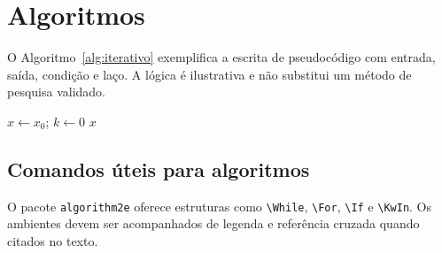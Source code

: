 \section{Algoritmos}
O Algoritmo~\ref{alg:iterativo} exemplifica a escrita de pseudocódigo com entrada, saída, condição e laço. A lógica é ilustrativa e não substitui um método de pesquisa validado.
\begin{algorithm}[htbp]
\caption{Iteração com critério de parada}\label{alg:iterativo}
$x\leftarrow x_0$; $k\leftarrow 0$\;
\Return $x$\;
\end{algorithm}

\subsection{Comandos úteis para algoritmos}
O pacote \texttt{algorithm2e} oferece estruturas como \verb|\While|, \verb|\For|, \verb|\If| e \verb|\KwIn|. Os ambientes devem ser acompanhados de legenda e referência cruzada quando citados no texto.
